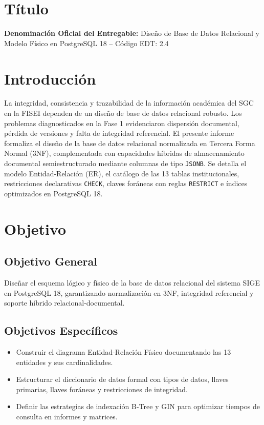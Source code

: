 \documentclass[12pt,a4paper]{article}
\begin{document}
\section{Título}
\textbf{Denominación Oficial del Entregable:} Diseño de Base de Datos Relacional y Modelo Físico en PostgreSQL 18 -- Código EDT: 2.4

\section{Introducción}
La integridad, consistencia y trazabilidad de la información académica del SGC en la FISEI dependen de un diseño de base de datos relacional robusto. Los problemas diagnosticados en la Fase 1 evidenciaron dispersión documental, pérdida de versiones y falta de integridad referencial. El presente informe formaliza el diseño de la base de datos relacional normalizada en Tercera Forma Normal (3NF), complementada con capacidades híbridas de almacenamiento documental semiestructurado mediante columnas de tipo \texttt{JSONB}. Se detalla el modelo Entidad-Relación (ER), el catálogo de las 13 tablas institucionales, restricciones declarativas \texttt{CHECK}, claves foráneas con reglas \texttt{RESTRICT} e índices optimizados en PostgreSQL 18.

\section{Objetivo}
\subsection{Objetivo General}
Diseñar el esquema lógico y físico de la base de datos relacional del sistema SIGE en PostgreSQL 18, garantizando normalización en 3NF, integridad referencial y soporte híbrido relacional-documental.
\subsection{Objetivos Específicos}
\begin{itemize}[leftmargin=1.5em, itemsep=2pt]
    \item Construir el diagrama Entidad-Relación Físico documentando las 13 entidades y sus cardinalidades.
    \item Estructurar el diccionario de datos formal con tipos de datos, llaves primarias, llaves foráneas y restricciones de integridad.
    \item Definir las estrategias de indexación B-Tree y GIN para optimizar tiempos de consulta en informes y matrices.
\end{itemize}
\end{document}
